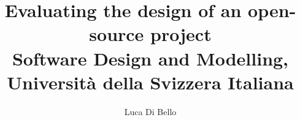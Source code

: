 \documentclass[a4paper, 11pt]{article}
\title{Evaluating the design of an open-source project\\\large Software Design and Modelling, Università della Svizzera Italiana}
\author{Luca Di Bello}
\date{\displaydate{today}}
\begin{document}
\maketitle





\vfill

\printbibliography
\end{document}
